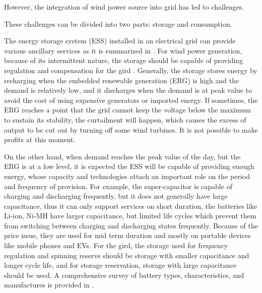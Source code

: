 \documentclass[12pt,a4paper]{report}
\begin{document}
        
        However, the integration of wind power source into grid has led to challenges.

        These challenges can be divided into two parts: storage and consumption.

        The energy storage system (ESS) installed in an electrical grid can provide various ancillary services as it is summarized in \cite{paper:Lawder2014}. 
        For wind power generation, because of its intermittent nature, the storage should be capable of providing regulation and compensation for the gird \cite{paper:gridrisk} \cite{paper:gridscenarios}.
        Generally, the storage stores energy by recharging when the embedded renewable generation (ERG) is high and the demand is relatively low, 
        and it discharges when the demand is at peak value to avoid the cost of using expensive generators or imported energy. 
        If sometimes, the ERG reaches a point that the grid cannot keep the voltage below the maximum to sustain its stability, 
        the curtailment will happen, which causes the excess of output to be cut out by turning off some wind turbines. It is not possible to make profits 
        at this moment. 
        
        On the other hand, when demand reaches the peak value of the day, but the ERG is at a low level, 
        it is expected the ESS will be capable of providing enough energy, whose capacity and technologies attach an important role on the period and frequency
        of provision. For example, the super-capacitor is capable of charging and discharging frequently, but it does not
        generally have large capacitance, thus it can only support services on short duration, the batteries like Li-ion, Ni-MH
        have larger capacitance, but limited life cycles which prevent them from switching between charging and discharging states
        frequently. Because of the price issue, they are used for mid term duration and mostly on portable devices like mobile phones and
        EVs. For the gird, the storage used for frequency regulation and spinning reserve should be storage with smaller capacitance and longer cycle life, and for storage reservation, storage with large capacitance should be used.
        A comprehensive survey of battery types, characteristics, and manufactures is provided in \cite{website:benson_benson_benson_benson_microgrid}.
        
\end{document}

